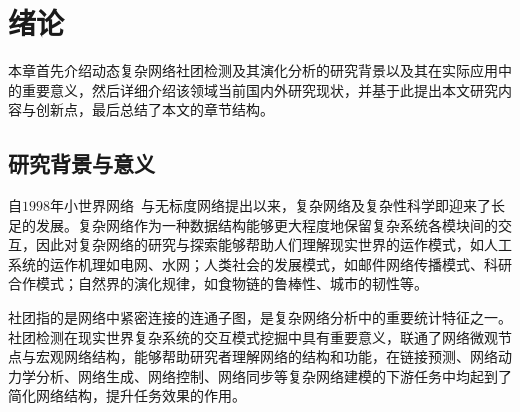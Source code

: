 
\baselineskip 20pt

\chapter{绪论}
\label{chap:1}

本章首先介绍动态复杂网络社团检测及其演化分析的研究背景以及其在实际应用中的重要意义，然后详细介绍该领域当前国内外研究现状，并基于此提出本文研究内容与创新点，最后总结了本文的章节结构。
 


\section{研究背景与意义}




自$1998$年小世界网络~\cite{watts1998collective}与无标度网络\cite{albert1999diameter}提出以来，复杂网络及复杂性科学即迎来了长足的发展。复杂网络作为一种数据结构能够更大程度地保留复杂系统各模块间的交互，因此对复杂网络的研究与探索能够帮助人们理解现实世界的运作模式，如人工系统的运作机理如电网\cite{mets2014combining}、水网\cite{bodini2002towards}；人类社会的发展模式，如邮件网络传播模式\cite{barnes2024temporal}、科研合作模式\cite{mariani2024collective}；自然界的演化规律，如食物链的鲁棒性\cite{dunne2002food}、城市的韧性\cite{zhang2018review}等。


社团指的是网络中紧密连接的连通子图，是复杂网络分析中的重要统计特征之一。社团检测在现实世界复杂系统的交互模式挖掘中具有重要意义，联通了网络微观节点与宏观网络结构，能够帮助研究者理解网络的结构和功能，在链接预测、网络动力学分析、网络生成、网络控制、网络同步等复杂网络建模的下游任务中均起到了简化网络结构，提升任务效果的作用\cite{kumar2024community,fortunato2016community}。

